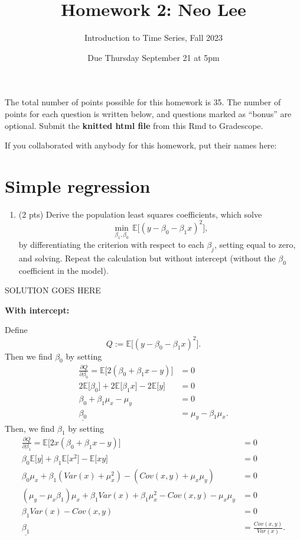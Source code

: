 \documentclass[
]{article}
\title{Homework 2: Neo Lee}
\subtitle{Introduction to Time Series, Fall 2023}
\author{}
\date{\vspace{-2.5em}Due Thursday September 21 at 5pm}
\providecommand{\tightlist}{%
  \setlength{\itemsep}{0pt}\setlength{\parskip}{0pt}}
\begin{document}
\maketitle

The total number of points possible for this homework is 35. The number
of points for each question is written below, and questions marked as
``bonus'' are optional. Submit the \textbf{knitted html file} from this
Rmd to Gradescope.

If you collaborated with anybody for this homework, put their names
here:

\hypertarget{simple-regression}{%
\section{Simple regression}\label{simple-regression}}

\begin{enumerate}
\def\labelenumi{\arabic{enumi}.}
\tightlist
\item
  (2 pts) Derive the population least squares coefficients, which solve
  \[
  \min_{\beta_1, \beta_0} \, \mathbb{E} \big[ (y - \beta_0 - \beta_1 x)^2 \big],
  \] by differentiating the criterion with respect to each \(\beta_j\),
  setting equal to zero, and solving. Repeat the calculation but without
  intercept (without the \(\beta_0\) coefficient in the model).
\end{enumerate}

SOLUTION GOES HERE

\textbf{With intercept:}

Define \[Q := \mathbb{E} \big[ (y - \beta_0 - \beta_1 x)^2 \big].\] Then
we find \(\beta_0\) by setting \begin{align*}
    \frac{\partial Q}{\partial \beta_0} = \mathbb{E} \big[2 (\beta_0 + \beta_1 x - y) \big] & = 0 \\
    2 \mathbb{E}\big[\beta_0 \big] + 2 \mathbb{E}\big[\beta_1 x \big] - 
    2 \mathbb{E}\big[y \big] & = 0 \\
    \beta_0 + \beta_1 \mu_x - \mu_y & = 0 \\
    \underline{\beta_0} & = \mu_y - \beta_1 \mu_x.
\end{align*} Then, we find \(\beta_1\) by setting \begin{align*}
    \frac{\partial Q}{\partial \beta_1} = \mathbb{E} \big[2 x (\beta_0 + \beta_1 x - y) \big] & = 0 \\
    \beta_0\mathbb{E}\big[y \big] + \beta_1\mathbb{E}\big[x^2 \big] - \mathbb{E}\big[xy \big] & = 0 \\
    \beta_0\mu_x + \beta_1\left(Var(x)+\mu_x^2\right) - \left(Cov(x,y) + \mu_x\mu_y\right) & = 0 \\
    (\mu_y - \mu_x\beta_1)\mu_x + \beta_1Var(x) + \beta_1\mu_x^2 - Cov(x,y) - \mu_x\mu_y & = 0 \\
    \beta_1Var(x) - Cov(x,y) & = 0 \\
    \underline{\beta_1} & = \frac{Cov(x,y)}{Var(x)}.
\end{align*}
\end{document}
